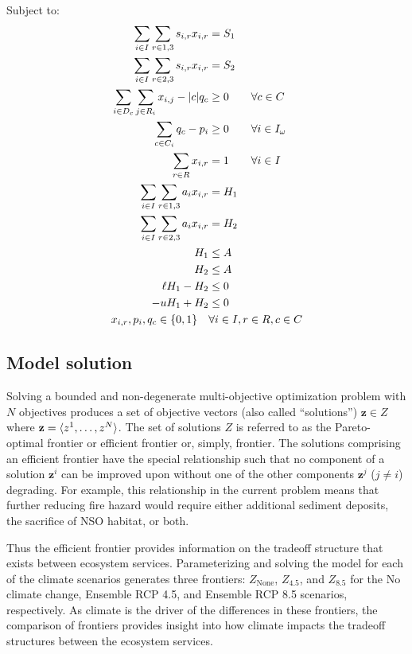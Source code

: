 Subject to:
\begin{align}
\sum_{i\in I} \sum_{r\in 1,3} s_{i,r} x_{i,r} &= S_1 \notag\\
\sum_{i\in I} \sum_{r\in 2,3} s_{i,r} x_{i,r} &= S_2 \notag\\
\sum_{i \in D_c} \sum_{j \in R_i}x_{i,j} - |c| q_c &\ge 0 \qquad \forall c \in C \notag\\
\sum_{c \in C_i} q_c - p_i &\ge 0 \qquad \forall i \in I_\omega \notag\\
\sum_{r \in R} x_{i,r} &= 1  \qquad \forall i \in I \notag\\
\sum_{i \in I} \sum_{r \in 1,3} a_i x_{i,r} &= H_1 \notag\\
\sum_{i \in I} \sum_{r \in 2,3} a_i x_{i,r} &= H_2 \notag\\
H_1 &\le A \notag\\
H_2 &\le A \notag\\
\ell H_1 - H_2 &\le 0 \notag\\
-u H_1 + H_2 &\le 0 \notag\\
x_{i,r}, p_i, q_c \in \{0,1\} \quad &\forall i \in I, r \in R, c \in C \label{eqn:constraintNonNeg}
\end{align}

\subsection{Model solution}
Solving a bounded and non-degenerate multi-objective optimization problem with $N$ objectives produces a set of objective vectors (also called ``solutions'') $\mathbf{z} \in Z$ where $\mathbf{z}=\braket{z^1,\ldots,z^N}$. The set of solutions $Z$ is referred to as the Pareto-optimal frontier or efficient frontier or, simply, frontier. The solutions comprising an efficient frontier have the special relationship such that no component of a solution $\mathbf{z}^i$ can be improved upon without one of the other components $\mathbf{z}^j$ ($j \neq i$) degrading. For example, this relationship in the current problem means that further reducing fire hazard would require either additional sediment deposits, the sacrifice of NSO habitat, or both.

Thus the efficient frontier provides information on the tradeoff structure that exists between ecosystem services. Parameterizing and solving the model for each of the climate scenarios generates three frontiers: $Z_{\text{None}}$, $Z_{4.5}$, and $Z_{8.5}$ for the No climate change, Ensemble RCP 4.5, and Ensemble RCP 8.5 scenarios, respectively. As climate is the driver of the differences in these frontiers, the comparison of frontiers provides insight into how climate impacts the tradeoff structures between the ecosystem services.

